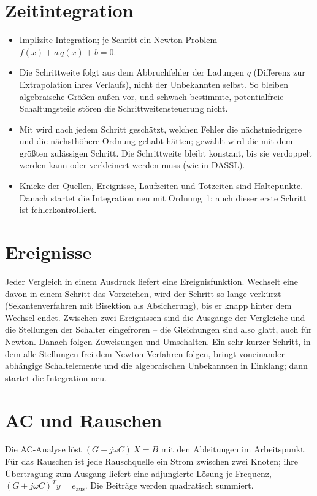 \section{Zeitintegration}

\begin{itemize}
  \item Implizite Integration; je Schritt ein Newton-Problem
    $f(x) + a\,q(x) + b = 0$.
  \item Die Schrittweite folgt aus dem Abbruchfehler der Ladungen $q$
    (Differenz zur Extrapolation ihres Verlaufs), nicht der Unbekannten
    selbst. So bleiben algebraische Größen außen vor, und schwach
    bestimmte, potentialfreie Schaltungsteile stören die
    Schrittweitensteuerung nicht.
  \item Mit  wird nach jedem Schritt geschätzt, welchen Fehler
    die nächstniedrigere und die nächsthöhere Ordnung gehabt hätten;
    gewählt wird die mit dem größten zulässigen Schritt. Die Schrittweite
    bleibt konstant, bis sie verdoppelt werden kann oder verkleinert werden
    muss (wie in DASSL).
  \item Knicke der Quellen, Ereignisse, Laufzeiten und Totzeiten sind
    Haltepunkte. Danach startet die Integration neu mit Ordnung~1; auch
    dieser erste Schritt ist fehlerkontrolliert.
\end{itemize}

\section{Ereignisse}

Jeder Vergleich in einem Ausdruck liefert eine Ereignisfunktion. Wechselt
eine davon in einem Schritt das Vorzeichen, wird der Schritt so lange
verkürzt (Sekantenverfahren mit Bisektion als Absicherung), bis er knapp
hinter dem Wechsel endet. Zwischen zwei Ereignissen sind die Ausgänge der
Vergleiche und die Stellungen der Schalter eingefroren – die Gleichungen
sind also glatt, auch für Newton. Danach folgen Zuweisungen und
Umschalten. Ein sehr kurzer Schritt, in dem alle Stellungen frei dem
Newton-Verfahren folgen, bringt voneinander abhängige Schaltelemente und die
algebraischen Unbekannten in Einklang; dann startet die Integration neu.

\section{AC und Rauschen}

Die AC-Analyse löst $(G + j\omega C)\,X = B$ mit den Ableitungen im
Arbeitspunkt. Für das Rauschen ist jede Rauschquelle ein Strom zwischen zwei
Knoten; ihre Übertragung zum Ausgang liefert eine adjungierte Lösung je
Frequenz, $(G + j\omega C)^T y = e_\text{aus}$. Die Beiträge werden
quadratisch summiert.

